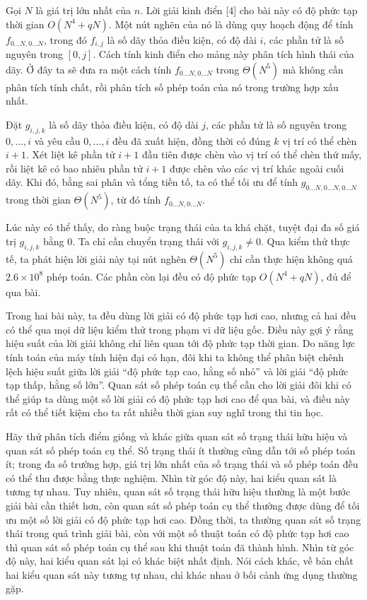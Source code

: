 \documentclass[11pt]{article}
\begin{document}
Gọi \(N\) là giá trị lớn nhất của \(n\). Lời giải kinh điển [4] cho bài này
có độ phức tạp thời gian \(O(N^4+qN)\). Một nút nghẽn của nó là dùng quy hoạch
động để tính \(f_{0\ldots N,0\ldots N}\), trong đó \(f_{i,j}\) là số dãy thỏa
điều kiện, có độ dài \(i\), các phần tử là số nguyên trong \([0,j]\). Cách
tính kinh điển cho mảng này phân tích hình thái của dãy. Ở đây ta sẽ đưa ra
một cách tính \(f_{0\ldots N,0\ldots N}\) trong \(\Theta(N^5)\) mà không cần
phân tích tính chất, rồi phân tích số phép toán của nó trong trường hợp xấu
nhất.

Đặt \(g_{i,j,k}\) là số dãy thỏa điều kiện, có độ dài \(j\), các phần tử là số
nguyên trong \(0,\ldots,i\) và yêu cầu \(0,\ldots,i\) đều đã xuất hiện, đồng
thời có đúng \(k\) vị trí có thể chèn \(i+1\). Xét liệt kê phần tử \(i+1\) đầu
tiên được chèn vào vị trí có thể chèn thứ mấy, rồi liệt kê có bao nhiêu phần
tử \(i+1\) được chèn vào các vị trí khác ngoài cuối dãy. Khi đó, bằng sai phân
và tổng tiền tố, ta có thể tối ưu để tính \(g_{0\ldots N,0\ldots N,0\ldots N}\)
trong thời gian \(\Theta(N^5)\), từ đó tính \(f_{0\ldots N,0\ldots N}\).

Lúc này có thể thấy, do ràng buộc trạng thái của ta khá chặt, tuyệt đại đa số
giá trị \(g_{i,j,k}\) bằng \(0\). Ta chỉ cần chuyển trạng thái với
\(g_{i,j,k}\ne 0\). Qua kiểm thử thực tế, ta phát hiện lời giải này tại nút
nghẽn \(\Theta(N^5)\) chỉ cần thực hiện không quá \(2.6\times 10^8\) phép
toán. Các phần còn lại đều có độ phức tạp \(O(N^4+qN)\), đủ để qua bài.

Trong hai bài này, ta đều dùng lời giải có độ phức tạp hơi cao, nhưng cả hai
đều có thể qua mọi dữ liệu kiểm thử trong phạm vi dữ liệu gốc. Điều này gợi ý
rằng hiệu suất của lời giải không chỉ liên quan tới độ phức tạp thời gian. Do
năng lực tính toán của máy tính hiện đại có hạn, đôi khi ta không thể phân
biệt chênh lệch hiệu suất giữa lời giải ``độ phức tạp cao, hằng số nhỏ'' và
lời giải ``độ phức tạp thấp, hằng số lớn''. Quan sát số phép toán cụ thể cần
cho lời giải đôi khi có thể giúp ta dùng một số lời giải có độ phức tạp hơi
cao để qua bài, và điều này rất có thể tiết kiệm cho ta rất nhiều thời gian
suy nghĩ trong thi tin học.

Hãy thử phân tích điểm giống và khác giữa quan sát số trạng thái hữu hiệu và
quan sát số phép toán cụ thể. Số trạng thái ít thường cũng dẫn tới số phép
toán ít; trong đa số trường hợp, giá trị lớn nhất của số trạng thái và số phép
toán đều có thể thu được bằng thực nghiệm. Nhìn từ góc độ này, hai kiểu quan
sát là tương tự nhau. Tuy nhiên, quan sát số trạng thái hữu hiệu thường là
một bước giải bài cần thiết hơn, còn quan sát số phép toán cụ thể thường được
dùng để tối ưu một số lời giải có độ phức tạp hơi cao. Đồng thời, ta thường
quan sát số trạng thái trong quá trình giải bài, còn với một số thuật toán có
độ phức tạp hơi cao thì quan sát số phép toán cụ thể sau khi thuật toán đã
thành hình. Nhìn từ góc độ này, hai kiểu quan sát lại có khác biệt nhất định.
Nói cách khác, về bản chất hai kiểu quan sát này tương tự nhau, chỉ khác nhau
ở bối cảnh ứng dụng thường gặp.
\end{document}
